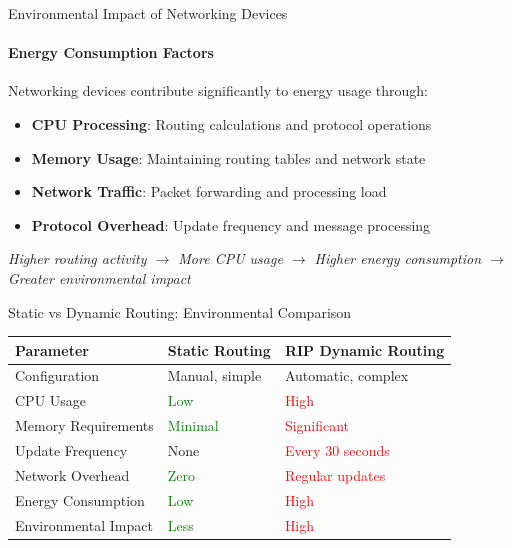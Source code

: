 \documentclass{beamer}
\begin{document}
\begin{frame}{Environmental Impact of Networking Devices}
    \framesubtitle{Energy Consumption Factors}
    
    Networking devices contribute significantly to energy usage through:
    \begin{itemize}
        \item \textbf{CPU Processing}: Routing calculations and protocol operations
        \item \textbf{Memory Usage}: Maintaining routing tables and network state
        \item \textbf{Network Traffic}: Packet forwarding and processing load
        \item \textbf{Protocol Overhead}: Update frequency and message processing
    \end{itemize}
    
    \vspace{0.5cm}
    \centering
    \textit{Higher routing activity $\rightarrow$ More CPU usage $\rightarrow$ Higher energy consumption $\rightarrow$ Greater environmental impact}
\end{frame}

\begin{frame}{Static vs Dynamic Routing: Environmental Comparison}
    
    \begin{table}
    \centering
    \begin{tabular}{|p{2.5cm}|p{3.5cm}|p{3.5cm}|}
    \hline
    \textbf{Parameter} & \textbf{Static Routing} & \textbf{RIP Dynamic Routing} \\ \hline
    Configuration & Manual, simple & Automatic, complex \\ \hline
    CPU Usage & \textcolor{green}{Low} & \textcolor{red}{High} \\ \hline
    Memory Requirements & \textcolor{green}{Minimal} & \textcolor{red}{Significant} \\ \hline
    Update Frequency & \textcolor{}{None} & \textcolor{red}{Every 30 seconds} \\ \hline
    Network Overhead & \textcolor{green}{Zero} & \textcolor{red}{Regular updates} \\ \hline
    Energy Consumption & \textcolor{green}{Low} & \textcolor{red}{High} \\ \hline
    Environmental Impact & \textcolor{green}{Less} & \textcolor{red}{High} \\ \hline
    \end{tabular}
    \end{table}


    
\end{frame}
\end{document}
